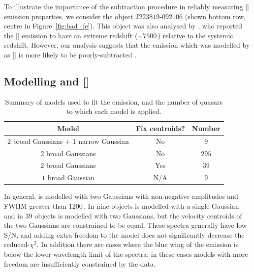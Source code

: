 To illustrate the importance of the  subtraction procedure in reliably measuring [] emission properties, we consider the object J$223819$-$092106$ (shown bottom row, centre in Figure~\ref{fig:bad_fe}). 
This object was also analysed by \citet{shen16a}, who reported the [] emission to have an extreme redshift ($\sim7500$\,\kms) relative to the \citet{hewett10} systemic redshift.
However, our analysis suggests that the emission which was modelled by \citet{shen16a} as [] is more likely to be poorly-subtracted .  

\subsection{Modelling \hb and []}
\label{sec:oiiimodel}

\begin{table}
  \centering
  \footnotesize 
    \begin{tabular}{ccc} 
    \hline
    Model & Fix centroids? & Number \\
    \hline
    $2$ broad Gaussians + $1$ narrow Gaussian & No & $9$ \\
    $2$ broad Gaussians & No  &  $295$ \\
    $2$ broad Gaussians & Yes &  $39$ \\
    $1$ broad Gaussian  & N/A &  $9$ \\
    \hline
    \end{tabular}
    \caption[{Summary of models used to fit the \hb emission, and the number of quasars to which each model is applied.}]{Summary of models used to fit the \hb emission, and the number of quasars to which each model is applied.}
  \label{tab:hbmod}
\end{table} 

In general, \hb is modelled with two Gaussians with non-negative amplitudes and FWHM greater than $1200$\,\kms.
In nine objects \hb is modelled with a single Gaussian and in $39$ objects \hb is modelled with two Gaussians, but the velocity centroids of the two Gaussians are constrained to be equal. 
These spectra generally have low S/N, and adding extra freedom to the model does not significantly decrease the  reduced-$\chi^2$.
In addition there are cases where the blue wing of the \hb emission is below the lower wavelength limit of the spectra; in these cases models with more freedom are insufficiently constrained by the data.    


